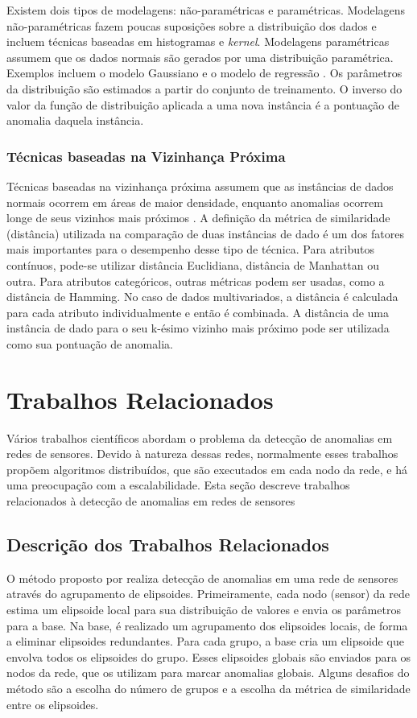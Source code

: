 \documentclass[cic,tc]{iiufrgs}
\begin{document}
Existem dois tipos de modelagens: não-paramétricas e paramétricas. Modelagens não-paramétricas fazem poucas suposições sobre a distribuição dos dados e incluem técnicas baseadas em histogramas e \textit{kernel}. Modelagens paramétricas assumem que os dados normais são gerados por uma distribuição paramétrica. Exemplos incluem o modelo Gaussiano e o modelo de regressão \cite{AnomalyDetectionSurvey2009}. Os parâmetros da distribuição são estimados a partir do conjunto de treinamento. O inverso do valor da função de distribuição aplicada a uma nova instância é a pontuação de anomalia daquela instância.

\subsubsection{Técnicas baseadas na Vizinhança Próxima}
Técnicas baseadas na vizinhança próxima assumem que as instâncias de dados normais ocorrem em áreas de maior densidade, enquanto anomalias ocorrem longe de seus vizinhos mais próximos \cite{AnomalyDetectionSurvey2009}. A definição da métrica de similaridade (distância) utilizada na comparação de duas instâncias de dado é um dos fatores mais importantes para o desempenho desse tipo de técnica. Para atributos contínuos, pode-se utilizar distância Euclidiana, distância de Manhattan ou outra. Para atributos categóricos, outras métricas podem ser usadas, como a distância de Hamming. No caso de dados multivariados, a distância é calculada para cada atributo individualmente e então é combinada. A distância de uma instância de dado para o seu k-ésimo vizinho mais próximo pode ser utilizada como sua pontuação de anomalia.

\section{Trabalhos Relacionados}
\label{trab_rel}
Vários trabalhos científicos abordam o problema da detecção de anomalias em redes de sensores. Devido à natureza dessas redes, normalmente esses trabalhos propõem algoritmos distribuídos, que são executados em cada nodo da rede, e há uma preocupação com a escalabilidade. Esta seção descreve trabalhos relacionados à detecção de anomalias em redes de sensores

\subsection{Descrição dos Trabalhos Relacionados}
O método proposto por \cite{Ellipsoids2009} realiza detecção de anomalias em uma rede de sensores através do agrupamento de elipsoides. Primeiramente, cada nodo (sensor) da rede estima um elipsoide local para sua distribuição de valores e envia os parâmetros para a base. Na base, é realizado um agrupamento dos elipsoides locais, de forma a eliminar elipsoides redundantes. Para cada grupo, a base cria um elipsoide que envolva todos os elipsoides do grupo. Esses elipsoides globais são enviados para os nodos da rede, que os utilizam para marcar anomalias globais. Alguns desafios do método são a escolha do número de grupos e a escolha da métrica de similaridade entre os elipsoides.
\end{document}
